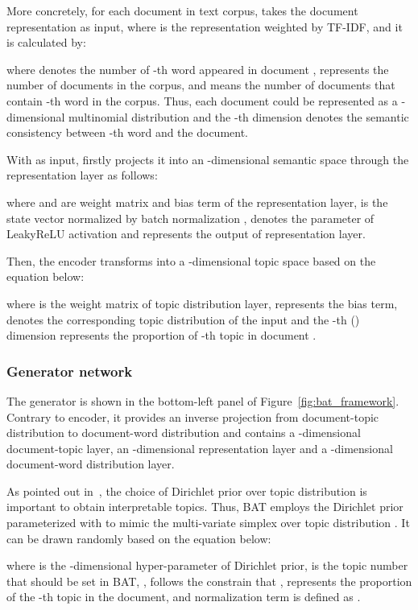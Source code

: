 \documentclass[11pt,a4paper]{article}
\begin{document}
More concretely, for each document  in text corpus,  takes the document representation  as input, where  is the representation weighted by TF-IDF, and it is calculated by:

where  denotes the number of -th word appeared in document ,  represents the number of documents in the corpus, and  means the number of documents that contain -th word in the corpus. Thus, each document could be represented as a -dimensional multinomial distribution and the -th dimension denotes the semantic consistency between -th word and the document. 

With  as input,  firstly projects it into an -dimensional semantic space through the representation layer as follows:

where  and  are weight matrix and bias term of the representation layer,  is the state vector normalized by batch normalization ,    denotes the parameter of LeakyReLU activation and  represents the output of representation layer.  

Then,  the encoder transforms  into a -dimensional topic space based on the equation below: 

where  is the weight matrix of topic distribution layer,  represents the bias term,  denotes the corresponding topic distribution of the input  and the -th () dimension  represents the proportion of -th topic in document .


\subsubsection{Generator network}
The generator  is shown in the bottom-left panel of Figure~\ref{fig:bat_framework}. Contrary to encoder, it provides an inverse projection from document-topic distribution to document-word distribution and contains a -dimensional document-topic layer, an -dimensional representation layer and a -dimensional document-word distribution layer.

As pointed out in~\cite{wallach2009rethinking}, the choice of Dirichlet prior over topic distribution is important to obtain interpretable topics. Thus, BAT employs the Dirichlet prior parameterized with  to mimic the multi-variate simplex over topic distribution . It can be drawn randomly based on the equation below:
\begin{comment}

\end{comment}

where  is the -dimensional hyper-parameter of Dirichlet prior,  is the topic number that should be set in BAT, , follows the constrain that , represents the proportion of the -th topic in the document, and normalization term  is defined as .
\end{document}
